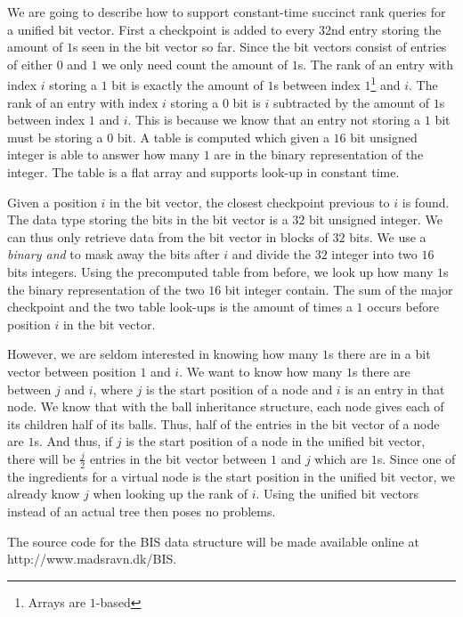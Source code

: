 We are going to describe how to support constant-time succinct rank queries for a unified bit vector. First a checkpoint is added to every 32nd entry storing the amount of $1$s seen in the bit vector so far. Since the bit vectors consist of entries of either $0$ and $1$ we only need count the amount of $1$s. The rank of an entry with index $i$ storing a $1$ bit is exactly the amount of $1$s between index $1$\footnote{Arrays are $1$-based} and $i$. The rank of an entry with index $i$ storing a $0$ bit is $i$ subtracted by the amount of $1$s between index $1$ and $i$. This is because we know that an entry not storing a $1$ bit must be storing a $0$ bit. A table is computed which given a $16$ bit unsigned integer is able to answer how many $1$ are in the binary representation of the integer. The table is a flat array and supports look-up in constant time.

Given a position $i$ in the bit vector, the closest checkpoint previous to $i$ is found. The data type storing the bits in the bit vector is a $32$ bit unsigned integer. We can thus only retrieve data from the bit vector in blocks of $32$ bits. We use a \emph{binary and} to mask away the bits after $i$ and divide the $32$ integer into two $16$ bits integers. Using the precomputed table from before, we look up how many $1$s the binary representation of the two $16$ bit integer contain. The sum of the major checkpoint and the two table look-ups is the amount of times a $1$ occurs before position $i$ in the bit vector. 

However, we are seldom interested in knowing how many $1$s there are in a bit vector between position $1$ and $i$. We want to know how many $1$s there are between $j$ and $i$, where $j$ is the start position of a node and $i$ is an entry in that node. We know that with the ball inheritance structure, each node gives each of its children half of its balls. Thus, half of the entries in the bit vector of a node are $1$s. And thus, if $j$ is the start position of a node in the unified bit vector, there will be $\frac{j}{2}$ entries in the bit vector between $1$ and $j$ which are $1$s. Since one of the ingredients for a virtual node is the start position in the unified bit vector, we already know $j$ when looking up the rank of $i$. Using the unified bit vectors instead of an actual tree then poses no problems.

The source code for the BIS data structure will be made available online at http://www.madsravn.dk/BIS.

